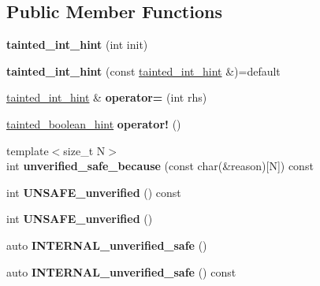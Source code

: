 \subsection*{Public Member Functions}
\begin{DoxyCompactItemize}
\item 
\mbox{\label{classrlbox_1_1tainted__int__hint_a6dccc10c30d28b63ecdcdd2f35b0ba63}} 
{\bfseries tainted\+\_\+int\+\_\+hint} (int init)
\item 
\mbox{\label{classrlbox_1_1tainted__int__hint_aff51cd5556756d01d9623756bd079e3c}} 
{\bfseries tainted\+\_\+int\+\_\+hint} (const \hyperlink{classrlbox_1_1tainted__int__hint}{tainted\+\_\+int\+\_\+hint} \&)=default
\item 
\mbox{\label{classrlbox_1_1tainted__int__hint_a4111198d5937dd0e91a1830ff7617be8}} 
\hyperlink{classrlbox_1_1tainted__int__hint}{tainted\+\_\+int\+\_\+hint} \& {\bfseries operator=} (int rhs)
\item 
\mbox{\label{classrlbox_1_1tainted__int__hint_a9f716ceac11a70d7c3472b2c8f9fc5d5}} 
\hyperlink{classrlbox_1_1tainted__boolean__hint}{tainted\+\_\+boolean\+\_\+hint} {\bfseries operator!} ()
\item 
\mbox{\label{classrlbox_1_1tainted__int__hint_a1f7a28c11c9d09613fd347402fcb9b45}} 
{\footnotesize template$<$size\+\_\+t N$>$ }\\int {\bfseries unverified\+\_\+safe\+\_\+because} (const char(\&reason)\mbox{[}N\mbox{]}) const
\item 
\mbox{\label{classrlbox_1_1tainted__int__hint_ac3b2d7236f3e457c76eddee351357832}} 
int {\bfseries U\+N\+S\+A\+F\+E\+\_\+unverified} () const
\item 
\mbox{\label{classrlbox_1_1tainted__int__hint_a05e881c8eb389d1bf045507e36921ec9}} 
int {\bfseries U\+N\+S\+A\+F\+E\+\_\+unverified} ()
\item 
\mbox{\label{classrlbox_1_1tainted__int__hint_a6046f83981c177ea16ff1631cb436714}} 
auto {\bfseries I\+N\+T\+E\+R\+N\+A\+L\+\_\+unverified\+\_\+safe} ()
\item 
\mbox{\label{classrlbox_1_1tainted__int__hint_a4b0d4f31f2656bc8eb5a8221f66c5172}} 
auto {\bfseries I\+N\+T\+E\+R\+N\+A\+L\+\_\+unverified\+\_\+safe} () const
\end{DoxyCompactItemize}


